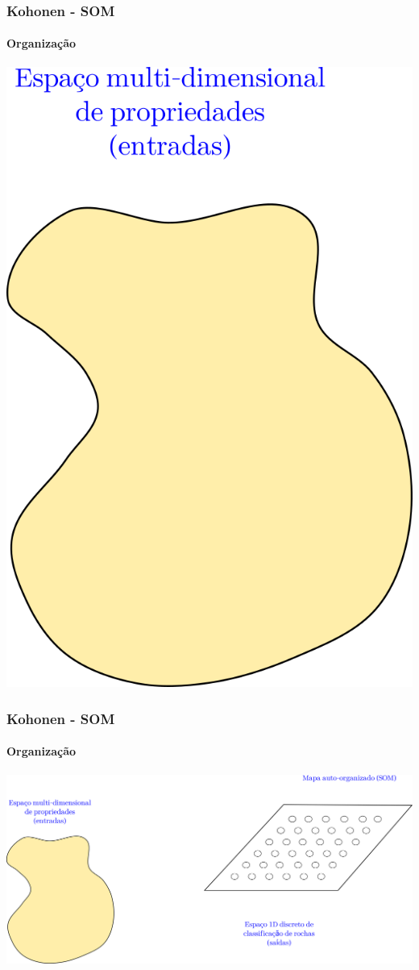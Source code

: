 \documentclass[aspectratio=10]{beamer} %
\begin{document}
\begin{frame}
	\frametitle{Kohonen - SOM}
	\framesubtitle{Organização}
	\includegraphics[scale=0.5]{Imagens/Introkoho1.png} 
\end{frame}


\begin{frame}
	\frametitle{Kohonen - SOM}
	\framesubtitle{Organização}
	\includegraphics[scale=0.5]{Imagens/Introkoho2.png} 
\end{frame}
\end{document}
